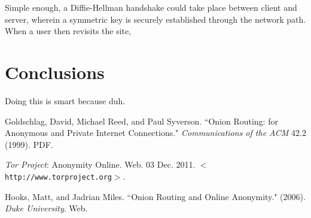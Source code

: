 \documentclass[12pt]{article}
\begin{document}
Simple enough, a Diffie-Hellman handshake could take place between client and server, wherein a symmetric key is securely established through the network path. When a user then revisits the site,

\section{Conclusions}
Doing this is smart because duh.



\begin{thebibliography}{1}

   Goldschlag, David, Michael Reed, and Paul Syverson. ``Onion Routing: for Anonymous and Private Internet Connections." {\it Communications of the ACM} 42.2 (1999). PDF.
  
   {\it Tor Project}: Anonymity Online. Web. 03 Dec. 2011. $<${\tt http://www.torproject.org}$>$.

    Hooks, Matt, and Jadrian Miles. ``Onion Routing and Online Anonymity." (2006). {\it Duke University}. Web.

  \end{thebibliography}
\end{document}
